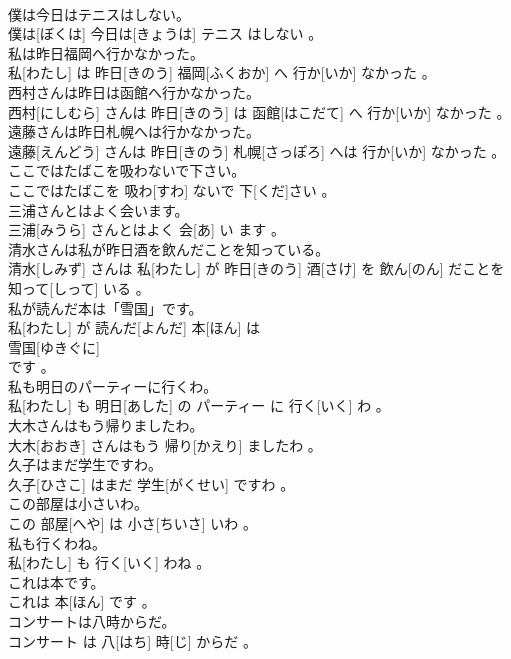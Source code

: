 \documentclass[8pt]{extreport}
\begin{document}
\begin{CJK}{UTF8}{min}
\\	僕は今日はテニスはしない。	
\\	僕は[ぼくは] 今日は[きょうは] テニス はしない 。
\\	私は昨日福岡へ行かなかった。	
\\	私[わたし] は 昨日[きのう] 福岡[ふくおか] へ 行か[いか] なかった 。
\\	西村さんは昨日は函館へ行かなかった。	
\\	西村[にしむら] さんは 昨日[きのう] は 函館[はこだて] へ 行か[いか] なかった 。
\\	遠藤さんは昨日札幌へは行かなかった。	
\\	遠藤[えんどう] さんは 昨日[きのう] 札幌[さっぽろ] へは 行か[いか] なかった 。
\\	ここではたばこを吸わないで下さい。	
\\	ここではたばこを 吸わ[すわ] ないで 下[くだ]さい 。
\\	三浦さんとはよく会います。	
\\	三浦[みうら] さんとはよく 会[あ] い ます 。
\\	清水さんは私が昨日酒を飲んだことを知っている。	
\\	清水[しみず] さんは 私[わたし] が 昨日[きのう] 酒[さけ] を 飲ん[のん] だことを 知って[しって] いる 。
\\	私が読んだ本は「雪国」です。	
\\	私[わたし] が 読んだ[よんだ] 本[ほん] は 
\\	雪国[ゆきぐに] 
\\	です 。
\\	私も明日のパーティーに行くわ。	
\\	私[わたし] も 明日[あした] の パーティー に 行く[いく] わ 。
\\	大木さんはもう帰りましたわ。	
\\	大木[おおき] さんはもう 帰り[かえり] ましたわ 。
\\	久子はまだ学生ですわ。	
\\	久子[ひさこ] はまだ 学生[がくせい] ですわ 。
\\	この部屋は小さいわ。	
\\	この 部屋[へや] は 小さ[ちいさ] いわ 。
\\	私も行くわね。	
\\	私[わたし] も 行く[いく] わね 。
\\	これは本です。	
\\	これは 本[ほん] です 。
\\	コンサートは八時からだ。	
\\	コンサート は 八[はち] 時[じ] からだ 。

\end{CJK}
\end{document}
